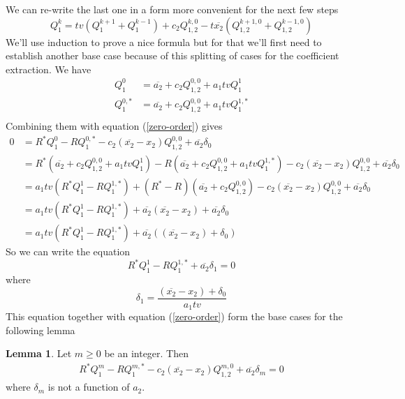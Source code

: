 \documentclass[12pt]{article}
\theoremstyle{definition} \newtheorem{definition}[theorem]{Definition}
\newtheorem{lemma}[theorem]{Lemma}
\newcommand{\ol}[1]{\overline{#1}}
\newcommand{\Qf}[1]{Q_{1,2}^{#1}}
\newcommand{\exx}{\!\!}
\begin{document}
We can re-write the last one in a form more convenient for the next few steps
\[\label{formula}
   Q_1^k = tv(Q_1^{k+1}+Q_1^{k-1}) + c_2 \Qf{k,0} - t\ol{x_2}(\Qf{k+1,0}+\Qf{k-1,0})
\]
We'll use induction to prove a nice formula but for that we'll first need to establish another base case because of this splitting of cases for the coefficient extraction. We have
\begin{align*}
   Q_1^0 &= \ol{a_2}+c_2\Qf{0,0} + a_1tvQ_1^1\\
   Q_1^{0,\ast} \exx&= \ol{a_2}+c_2\Qf{0,0} + a_1tvQ_1^{1,\ast}\\
\end{align*}
Combining them with equation (\ref{zero-order}) gives
\begin{align*}
0 &= R^\ast Q_1^0 -R Q_1^{0,\ast} - c_2(\ol{x_2}-x_2)\Qf{0,0} +\ol{a_2}\delta_0 \\
&= R^\ast ( \ol{a_2}+c_2\Qf{0,0} + a_1tvQ_1^1) -R (\ol{a_2}+c_2\Qf{0,0} + a_1tvQ_1^{1,\ast}) - c_2(\ol{x_2}-x_2)\Qf{0,0} +\ol{a_2}\delta_0\\
&=a_1tv(R^\ast Q_1^1-R Q_1^{1,\ast}) + (R^\ast-R)(\ol{a_2}+c_2\Qf{0,0}) - c_2(\ol{x_2}-x_2)\Qf{0,0} +\ol{a_2}\delta_0\\
& =a_1tv(R^\ast Q_1^1-R Q_1^{1,\ast})+\ol{a_2}(\ol{x_2}-x_2)+\ol{a_2}\delta_0\\
& =a_1tv(R^\ast Q_1^1-R Q_1^{1,\ast})+\ol{a_2}((\ol{x_2}-x_2)+\delta_0)
\end{align*}
So we can write the equation
\[
        R^\ast Q_1^1-R Q_1^{1,\ast}+\ol{a_2}\delta_1 = 0
\]
where
\[
   \delta_1 = \frac{(\ol{x_2}-x_2)+\delta_0}{a_1tv}
\]
This equation together with equation (\ref{zero-order}) form the base cases for the following lemma
\begin{lemma} Let $m\ge 0$ be an integer. Then
\begin{align}\label{coeff-eqn}
   R^\ast Q_1^m -R Q_1^{m,\ast} - c_2(\ol{x_2}-x_2)\Qf{m,0} +\ol{a_2}\delta_m = 0
\end{align}
where $\delta_m$ is not a function of $a_2$.
\end{lemma}
\end{document}

